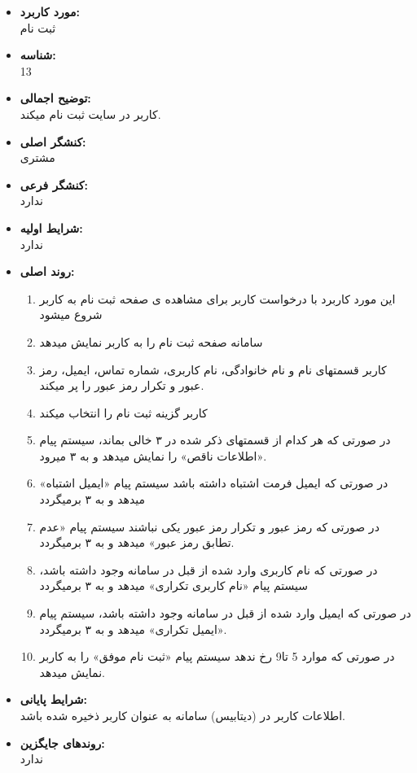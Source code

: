 \documentclass{article}
\begin{document}
\begin{itemize}
\item \textbf{مورد کاربرد:}\\
ثبت نام
\item \textbf{شناسه:}\\
13
\item \textbf{توضیح اجمالی:}\\
کاربر در سایت ثبت نام میکند.
\item \textbf{کنشگر اصلی:}\\
مشتری
\item \textbf{کنشگر فرعی:}\\
ندارد
\item \textbf{شرایط اولیه:}\\
ندارد
\item \textbf{روند اصلی:}\\
\begin{enumerate}
\item  این مورد کاربرد با درخواست کاربر برای مشاهده ی صفحه ثبت نام به کاربر شروع میشود
\item سامانه صفحه ثبت نام را به کاربر نمایش میدهد
\item کاربر قسمتهای نام و نام خانوادگی، نام کاربری، شماره تماس، ایمیل، رمز عبور و تکرار رمز عبور را پر میکند.
\item کاربر گزینه ثبت نام را انتخاب میکند
\item در صورتی که هر کدام از قسمتهای ذکر شده در ۳ خالی بماند، سیستم پیام «اطلاعات ناقص» را نمایش میدهد و به ۳ میرود.
\item  در صورتی که ایمیل فرمت اشتباه داشته باشد سیستم پیام «ایمیل اشتباه» میدهد و به ۳ برمیگردد
\item در صورتی که رمز عبور و تکرار رمز عبور یکی نباشند سیستم پیام «عدم تطابق رمز عبور» میدهد و به ۳ برمیگردد.
\item در صورتی که نام کاربری وارد شده از قبل در سامانه وجود داشته باشد، سیستم پیام «نام کاربری تکراری» میدهد و به ۳ برمیگردد
\item در صورتی که ایمیل وارد شده از قبل در سامانه وجود داشته باشد، سیستم پیام «ایمیل تکراری» میدهد و به ۳ برمیگردد.
\item در صورتی که موارد 5 تا9 رخ ندهد سیستم پیام «ثبت نام موفق» را به کاربر نمایش میدهد.
\end{enumerate}
\item \textbf{شرایط پایانی:}\\ 
اطلاعات کاربر در (دیتابیس) سامانه به عنوان کاربر ذخیره شده باشد.
\item \textbf{روندهای جایگزین:}\\
ندارد
\end{itemize}
\noindent\makebox[\linewidth]{\rule{\paperwidth}{0.4pt}}
\end{document}
